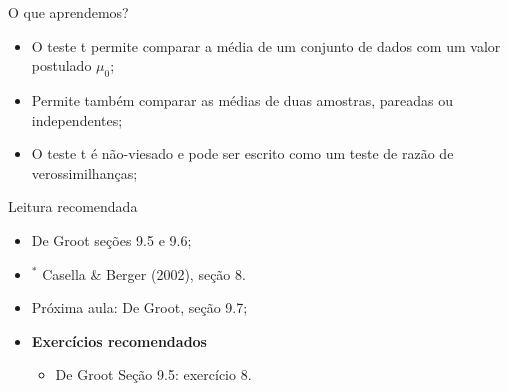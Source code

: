 \begin{frame}{O que aprendemos?}
\begin{itemize}
  \item[\faLightbulbO] O teste t permite comparar a média de um conjunto de dados com um valor postulado $\mu_0$;    
  \item[\faLightbulbO] Permite também comparar as médias de duas amostras, pareadas ou independentes;
  \item O teste t é não-viesado e pode ser escrito como um teste de razão de verossimilhanças;
   \end{itemize}
 \end{frame}

\begin{frame}{Leitura recomendada}
\begin{itemize}
 \item[\faBook] De Groot seções 9.5 e 9.6;
 \item[\faBook] $^\ast$ Casella \& Berger (2002), seção 8.
 \item[\faForward] Próxima aula: De Groot, seção 9.7;
 \item {\large\textbf{Exercícios recomendados}}
  \begin{itemize}
   \item[\faBookmark] De Groot Seção 9.5: exercício 8.
  \end{itemize}
 \end{itemize} 
\end{frame}
